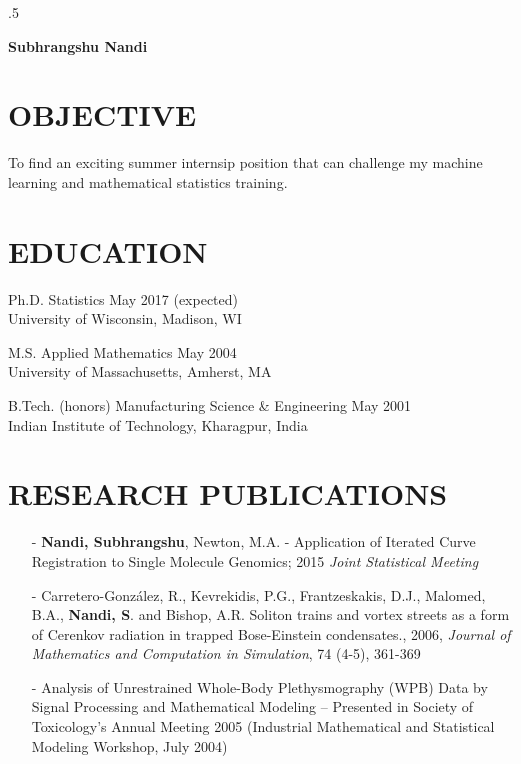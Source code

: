 \documentclass[11pt]{res} %
\begin{document}
 
\thispagestyle{empty} %

\moveleft.5\hoffset\centerline{\large\bf Subhrangshu Nandi}
\address{1300 University Ave, Suite 1250D \\   Madison, WI 53706  \\ (413) 530-1400}
\address{snandi@wisc.edu \\ nands31@gmail.com  \\ www.linkedin.com/in/nands31}
                                             
\begin{resume}
 
\section{OBJECTIVE}
To find an exciting summer internsip position that can challenge my machine learning and mathematical statistics training.
 
\section{EDUCATION} 
Ph.D. Statistics \hfill May 2017 (expected)\\
\noindent University of Wisconsin, Madison, WI

M.S. Applied Mathematics \hfill May 2004 \\
\noindent University of Massachusetts, Amherst, MA

B.Tech. (honors) Manufacturing Science \& Engineering \hfill May 2001 \\
\noindent Indian Institute of Technology, Kharagpur, India

\section{RESEARCH PUBLICATIONS} 
\begin{itemize}[leftmargin=*]
\item[-] {\bf{Nandi, Subhrangshu}}, Newton, M.A. - Application of Iterated Curve Registration to Single
Molecule Genomics; 2015 {\emph{Joint Statistical Meeting}}
\item[-] Carretero-González, R., Kevrekidis, P.G., Frantzeskakis, D.J., Malomed, B.A., {\bf{Nandi, S}}. and
Bishop, A.R. Soliton trains and vortex streets as a form of Cerenkov radiation in trapped
Bose-Einstein condensates., 2006, {\emph{Journal of Mathematics and Computation in
Simulation}}, 74 (4-5), 361-369
\item[-] Analysis of Unrestrained Whole-Body Plethysmography (WPB) Data by Signal Processing and
Mathematical Modeling – Presented in Society of Toxicology’s Annual Meeting 2005
(Industrial Mathematical and Statistical Modeling Workshop, July 2004)
\end{itemize}


\end{resume}
\end{document}
